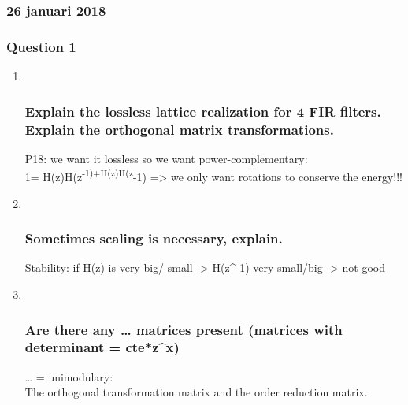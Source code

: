 \documentclass[
  a4paper,
  ,captions=tableheading
]{scrartcl}
\begin{document}
\subsubsection{}\label{section-22}

\subsubsection{\texorpdfstring{\textbf{26 januari
2018}}{26 januari 2018}}\label{januari-2018}

\subsubsection{Question 1}\label{question-1-5}

\begin{enumerate}
\def\labelenumi{\arabic{enumi}.}
\item ~
  \subsubsection{Explain the lossless lattice realization for 4 FIR
  filters. Explain the orthogonal matrix
  transformations.}\label{explain-the-lossless-lattice-realization-for-4-fir-filters.-explain-the-orthogonal-matrix-transformations.}

  P18: we want it lossless so we want power-complementary:\\
  1= H(z)H(z\textsuperscript{-1)+Ĥ(z)Ĥ(z}-1) =\textgreater{} we only
  want rotations to conserve the energy!!!
\item ~
  \subsubsection{Sometimes scaling is necessary,
  explain.}\label{sometimes-scaling-is-necessary-explain.}

  Stability: if H(z) is very big/ small -\textgreater{} H(z\^{}-1) very
  small/big -\textgreater{} not good
\item ~
  \subsubsection{Are there any \ldots{} matrices present (matrices with
  determinant =
  cte*z\^{}x)}\label{are-there-any-matrices-present-matrices-with-determinant-ctezx}

  \ldots{} = unimodulary:\\
  The orthogonal transformation matrix and the order reduction matrix.
\end{enumerate}
\end{document}
